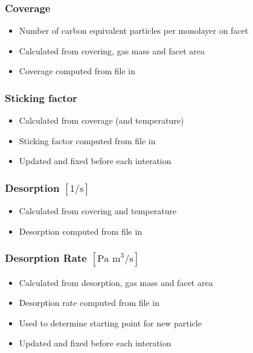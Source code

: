 \subsubsection{Coverage}
\begin{itemize}[noitemsep,topsep=0pt]
\item Number of carbon equivalent particles per monolayer on facet
\item Calculated from covering, gas mass and facet area
\item Coverage computed from  file in 
\end{itemize}

\subsubsection{Sticking factor}
\begin{itemize}[noitemsep,topsep=0pt]
\item Calculated from coverage (and temperature)
\item Sticking factor computed from  file in 
\item Updated and fixed before each interation
\end{itemize}

\subsubsection{Desorption $[1/\text{s}]$}
\begin{itemize}[noitemsep,topsep=0pt]
\item Calculated from covering and temperature
\item Desorption computed from  file in 
\end{itemize}

\subsubsection{Desorption Rate $[\text{Pa m}^3/\text{s}]$}
\begin{itemize}[noitemsep,topsep=0pt]
\item Calculated from desorption, gas mass and facet area
\item Desorption rate computed from  file in 
\item Used to determine starting point for new particle
\item Updated and fixed before each interation
\end{itemize}

